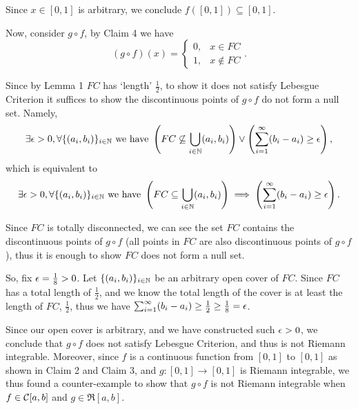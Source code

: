 {{{{                Since $x\in[0,1]$ is arbitrary, we conclude $f([0,1])\subseteq[0,1]$.
            }
        }



        Now, consider $g\circ f$, by Claim 4 we have $$(g\circ f)(x)=\begin{cases}0, &x\in FC\\ 1, & x\notin FC\end{cases}.$$

        Since by Lemma 1 $FC$ has `length' $\frac12$, to show it does not satisfy Lebesgue Criterion it suffices to show the discontinuous points of $g\circ f$ do not form a null set. Namely, $$\exists\ep>0,\forall \{(a_i,b_i)\}_{i\in\N}\T{ we have }\bra{FC\not\subseteq\bigcup_{i\in\N}(a_i,b_i)}\lor\bra{\sum_{i=1}^\infty(b_i-a_i)\geq\ep},$$ which is equivalent to $$\exists\ep>0,\forall \{(a_i,b_i)\}_{i\in\N}\T{ we have }\bra{FC\subseteq\bigcup_{i\in\N}(a_i,b_i)}\implies\bra{\sum_{i=1}^\infty(b_i-a_i)\geq\ep}.$$

        Since $FC$ is totally disconnected, we can see the set $FC$ contains the discontinuous points of $g\circ f$ (all points in $FC$ are also discontinuous points of $g\circ f$), thus it is enough to show $FC$ does not form a null set.

        So, fix $\ep=\frac18>0$. Let $\{(a_i,b_i)\}_{i\in\N}$ be an arbitrary open cover of $FC$. Since $FC$ has a total length of $\frac12$, and we know the total length of the cover is at least the length of $FC$, \ie $\frac12$, thus we have $\sum_{i=1}^\infty(b_i-a_i)\geq\frac12\geq\frac18=\ep$.

        Since our open cover is arbitrary, and we have constructed such $\ep>0$, we conclude that $g\circ f$ does not satisfy Lebesgue Criterion, and thus is not Riemann integrable. Moreover, since $f$ is a continuous function from $[0,1]$ to $[0,1]$ as shown in Claim 2 and Claim 3, and $g:[0,1]\to[0,1]$ is Riemann integrable, we thus found a counter-example to show that $g\circ f$ is not Riemann integrable when $f\in\cal{C}[a,b]$ and $g\in\mathfrak{R}[a,b]$.
    }
}
